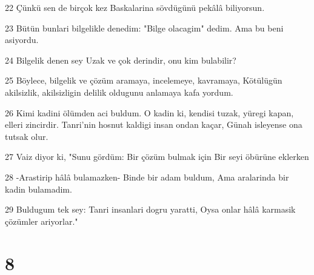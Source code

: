 \par 22 Çünkü sen de birçok kez Baskalarina sövdügünü pekâlâ biliyorsun.
\par 23 Bütün bunlari bilgelikle denedim: "Bilge olacagim" dedim. Ama bu beni asiyordu.
\par 24 Bilgelik denen sey Uzak ve çok derindir, onu kim bulabilir?
\par 25 Böylece, bilgelik ve çözüm aramaya, incelemeye, kavramaya, Kötülügün akilsizlik, akilsizligin delilik oldugunu anlamaya kafa yordum.
\par 26 Kimi kadini ölümden aci buldum. O kadin ki, kendisi tuzak, yüregi kapan, elleri zincirdir. Tanri'nin hosnut kaldigi insan ondan kaçar, Günah isleyense ona tutsak olur.
\par 27 Vaiz diyor ki, "Sunu gördüm: Bir çözüm bulmak için Bir seyi öbürüne eklerken
\par 28 -Arastirip hâlâ bulamazken- Binde bir adam buldum, Ama aralarinda bir kadin bulamadim.
\par 29 Buldugum tek sey: Tanri insanlari dogru yaratti, Oysa onlar hâlâ karmasik çözümler ariyorlar."

\chapter{8}

